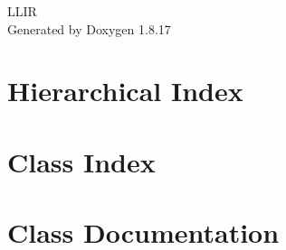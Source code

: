 \let\mypdfximage\pdfximage\def\pdfximage{\immediate\mypdfximage}\documentclass[twoside]{book}
\newcommand{\+}{\discretionary{\mbox{\scriptsize$\hookleftarrow$}}{}{}}
\newcommand{\clearemptydoublepage}{%
  \newpage{\pagestyle{empty}\cleardoublepage}%
}
\begin{document}
\begin{titlepage}
\vspace*{7cm}
\begin{center}%
{\Large L\+L\+IR }\\
\vspace*{1cm}
{\large Generated by Doxygen 1.8.17}\\
\end{center}
\end{titlepage}
\clearemptydoublepage
{}
\tableofcontents
\clearemptydoublepage
{}

\chapter{Hierarchical Index}

\chapter{Class Index}

\chapter{Class Documentation}




















































\backmatter
\newpage
{}
\clearemptydoublepage
{}
\printindex
\end{document}
